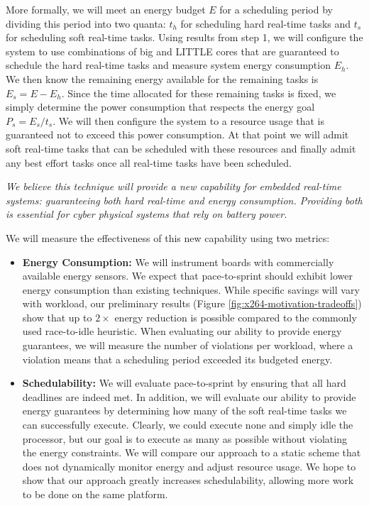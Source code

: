 More formally, we will meet an energy budget $E$ for a scheduling
period by dividing this period into two quanta: $t_h$ for scheduling
hard real-time tasks and $t_s$ for scheduling soft real-time tasks.
Using results from step 1, we will configure the system to use
combinations of big and LITTLE cores that are guaranteed to schedule
the hard real-time tasks and measure system energy consumption $E_h$.
We then know the remaining energy available for the remaining tasks is
$E_s = E - E_h$.  Since the time allocated for these remaining tasks
is fixed, we simply determine the power consumption that respects the
energy goal $P_s = E_s/t_s$.  We will then configure the system to a
resource usage that is guaranteed not to exceed this power
consumption.  At that point we will admit soft real-time tasks that
can be scheduled with these resources and finally admit any best
effort tasks once all real-time tasks have been scheduled.

\emph{We believe this technique will provide a new capability for
  embedded real-time systems: guaranteeing both hard real-time and
  energy consumption. Providing both is essential for cyber physical
  systems that rely on battery power.}

We will measure the effectiveness of this new capability using two
metrics:
\begin{itemize}\itemsep 0pt \parskip 0pt
\item \textbf{Energy Consumption:} We will instrument boards with
  commercially available energy sensors.  We expect that
  pace-to-sprint should exhibit lower energy consumption than existing
  techniques.  While specific savings will vary with workload, our
  preliminary results (Figure \ref{fig:x264-motivation-tradeoffs})
  show that up to $2 \times$ energy reduction is possible compared to
  the commonly used race-to-idle heuristic.  When evaluating our
  ability to provide energy guarantees, we will measure the number of
  violations per workload, where a violation means that a scheduling
  period exceeded its budgeted energy.
\item \textbf{Schedulability:} We will evaluate pace-to-sprint by
  ensuring that all hard deadlines are indeed met.  In addition, we
  will evaluate our ability to provide energy guarantees by
  determining how many of the soft real-time tasks we can successfully
  execute.  Clearly, we could execute none and simply idle the
  processor, but our goal is to execute as many as possible without
  violating the energy constraints.  We will compare our approach to a
  static scheme that does not dynamically monitor energy and adjust
  resource usage.  We hope to show that our approach greatly increases
  schedulability, allowing more work to be done on the same platform.
\end{itemize}

